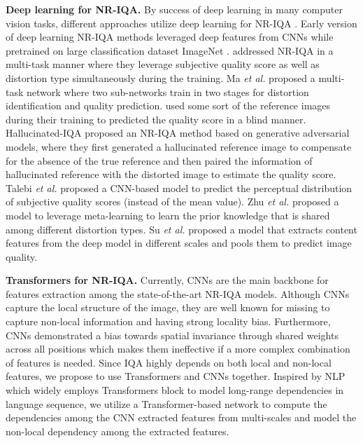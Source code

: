 \documentclass[10pt,twocolumn,letterpaper]{article}
\begin{document}
\textbf{Deep learning for NR-IQA.} By  success of deep learning \cite{krizhevsky2012imagenet,he2016deep} in many computer vision tasks, different approaches  utilize deep learning for  NR-IQA
\cite{kang2014convolutional,long2015fully,redmon2016you,bosse2017deep,zeng2017probabilistic,lin2018hallucinated,talebi2018nima,ma2017end,zhang2018blind,lin2018hallucinated,bianco2018use,yan2019naturalness,su2020blindly,zhu2020metaiqa,hosu2020koniq,zhang2020learning}.
Early version of deep learning NR-IQA methods  \cite{kang2014convolutional,bosse2016deep,kim2017deep,bosse2017deep,kim2017deep,zeng2017probabilistic} leveraged   deep features from  CNNs \cite{krizhevsky2012imagenet,he2016deep} while  pretrained on large classification dataset ImageNet \cite{deng2009imagenet}.
\cite{kang2015simultaneous,xu2016multi}   addressed NR-IQA  in a multi-task manner where they leverage subjective quality score as well as distortion type simultaneously during the training.
 Ma \textit{et al.} \cite{ma2017end} proposed  a multi-task network  where  two sub-networks train in two stages for distortion identification  and  quality prediction.
\cite{kim2016fully,kim2018deep,pan2018blind,lin2018hallucinated} used some sort of the reference images during their training  to predicted the quality score in a blind manner.
Hallucinated-IQA \cite{lin2018hallucinated} proposed an  NR-IQA method based on generative adversarial models, where they first generated a hallucinated reference image to compensate for 
the absence of the true reference and then paired the information of hallucinated reference with the distorted image to estimate the quality score.
Talebi \textit{et al.} \cite{talebi2018nima} proposed a CNN-based model to predict the perceptual distribution of subjective quality  scores (instead of the mean value). 
Zhu \textit{et al.} \cite{zhu2020metaiqa} proposed a model to leverage meta-learning to   learn the prior knowledge that is shared among different distortion types.
Su \textit{et al.} \cite{su2020blindly} proposed a model that extracts content features from the deep model in different scales and pools them to predict image quality. 



\textbf{Transformers for NR-IQA.} 
Currently, CNNs are the main backbone for  features extraction among the state-of-the-art NR-IQA models.
Although CNNs capture the local structure of the image, they are well known for missing to capture non-local information and having strong locality bias.
Furthermore, CNNs demonstrated  a bias towards spatial invariance through  shared weights across all positions which makes them  ineffective if a more complex combination of features is needed.
Since IQA   highly depends on both local and non-local features, we propose to use Transformers and CNNs together.
Inspired by NLP which widely employs Transformers block to   model long-range dependencies in language sequence, we utilize a Transformer-based network to compute the dependencies among the CNN extracted features from multi-scales and model the non-local dependency among the extracted features.
\end{document}

